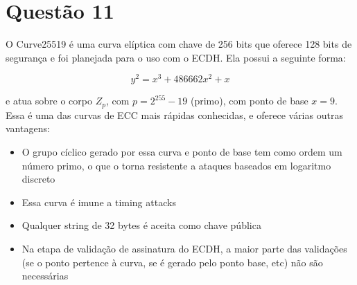 \documentclass{article}
\begin{document}
\section*{Questão 11}

O Curve25519 é uma curva elíptica com chave de 256 bits que oferece 128 bits de segurança e foi planejada para o uso com o ECDH. Ela possui a seguinte forma:

\begin{equation*}
    y^2 = x^3 + 486662x^2 + x
\end{equation*}

e atua sobre o corpo $Z_p$, com $p = 2^{255} - 19$ (primo), com ponto de base $x = 9$. Essa é uma das curvas de ECC mais rápidas conhecidas, e oferece várias outras vantagens:

\begin{itemize}
    \item O grupo cíclico gerado por essa curva e ponto de base tem como ordem um número primo, o que o torna resistente a ataques baseados em logaritmo discreto
    \item Essa curva é imune a timing attacks
    \item Qualquer string de 32 bytes é aceita como chave pública
    \item Na etapa de validação de assinatura do ECDH, a maior parte das validações (se o ponto pertence à curva, se é gerado pelo ponto base, etc) não são necessárias
\end{itemize}
\end{document}

